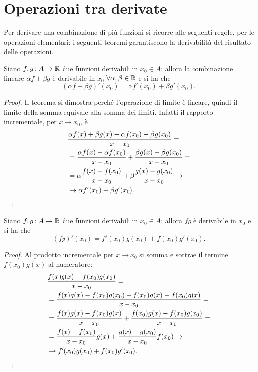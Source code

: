 \section{Operazioni tra derivate}
Per derivare una combinazione di più funzioni si ricorre alle seguenti regole, per le operazioni elementari: i seguenti teoremi garantiscono la derivabilità del risultato delle operazioni.
\begin{teorema}
Siano $f,g\colon A\to\mathbb{R}$ due funzioni derivabili in $x_0\in A$: allora la combinazione lineare $\alpha f+\beta g$ è derivabile in $x_0$ $\forall\alpha,\beta\in\mathbb{R}$ e si ha che
\begin{equation}
(\alpha f+\beta g)'(x_0)=\alpha f'(x_0)+\beta g'(x_0).
\end{equation}
\end{teorema}
\begin{proof}
Il teorema si dimostra perché l'operazione di limite è lineare, quindi il limite della somma equivale alla somma dei limiti. Infatti il rapporto incrementale, per $x\to x_0$, è
\begin{align*}
&\frac{\alpha f(x)+\beta g(x)-\alpha f(x_0)-\beta g(x_0)}{x-x_0}=\\
&=\frac{\alpha f(x)-\alpha f(x_0)}{x-x_0}+\frac{\beta g(x)-\beta g(x_0)}{x-x_0}=\\
&=\alpha\frac{f(x)-f(x_0)}{x-x_0}+\beta\frac{g(x)-g(x_0)}{x-x_0}\to\\
&\to\alpha f'(x_0)+\beta g'(x_0).\qedhere
\end{align*}
\end{proof}
\begin{teorema}
Siano $f,g\colon A\to\mathbb{R}$ due funzioni derivabili in $x_0\in A$: allora $fg$ è derivabile in $x_0$ e si ha che
\begin{equation}
(fg)'(x_0)=f'(x_0)g(x_0)+f(x_0)g'(x_0).
\end{equation}
\end{teorema}
\begin{proof}
Al prodotto incrementale per $x\to x_0$ si somma e sottrae il termine $f(x_0)g(x)$ al numeratore:
\begin{align*}
&\frac{f(x)g(x)-f(x_0)g(x_0)}{x-x_0}=\\
&=\frac{f(x)g(x)-f(x_0)g(x_0)+f(x_0)g(x)-f(x_0)g(x)}{x-x_0}=\\
&=\frac{f(x)g(x)-f(x_0)g(x)}{x-x_0}+\frac{f(x_0)g(x)-f(x_0)g(x_0)}{x-x_0}=\\
&=\frac{f(x)-f(x_0)}{x-x_0}g(x)+\frac{g(x)-g(x_0)}{x-x_0}f(x_0)\to\\
&\to f'(x_0)g(x_0)+f(x_0)g'(x_0).\qedhere
\end{align*}
\end{proof}

